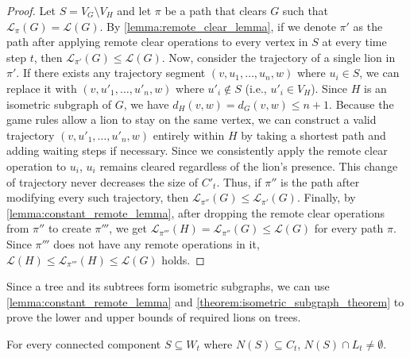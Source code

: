 \documentclass[a4paper,UKenglish,cleveref, autoref, thm-restate]{lipics-v2021}
\begin{document}
\begin{proof}
Let $S=V_G\setminus V_H$ and let $\pi$ be a path that clears $G$ such that $\mathcal{L}_\pi(G)=\mathcal{L}(G)$. By \cref{lemma:remote_clear_lemma}, if we denote $\pi'$ as the path after applying remote clear operations to every vertex in $S$ at every time step $t$, then $\mathcal{L}_{\pi'}(G) \leq \mathcal{L}(G)$. Now, consider the trajectory of a single lion in $\pi'$. If there exists any trajectory segment $(v, u_1, \dots, u_n, w)$ where $u_i \in S$, we can replace it with $(v, u'_1, \dots, u'_n, w)$ where $u'_i \notin S$ (i.e., $u'_i \in V_H$). Since $H$ is an isometric subgraph of $G$, we have $d_H(v, w) = d_G(v, w) \le n+1$. Because the game rules allow a lion to stay on the same vertex, we can construct a valid trajectory $(v, u'_1, \dots, u'_n, w)$ entirely within $H$ by taking a shortest path and adding waiting steps if necessary. Since we consistently apply the remote clear operation to $u_i$, $u_i$ remains cleared regardless of the lion's presence. This change of trajectory never decreases the size of $C'_t$. Thus, if $\pi''$ is the path after modifying every such trajectory, then $\mathcal{L}_{\pi''}(G) \leq \mathcal{L}_{\pi'}(G)$. Finally, by \cref{lemma:constant_remote_lemma}, after dropping the remote clear operations from $\pi''$ to create $\pi'''$, we get $\mathcal{L}_{\pi'''}(H) = \mathcal{L}_{\pi''}(G) \leq \mathcal{L}(G)$ for every path $\pi$. Since $\pi'''$ does not have any remote operations in it, $\mathcal{L}(H)\leq \mathcal{L}_{\pi'''}(H)\leq \mathcal{L}(G)$ holds.
\end{proof}

Since a tree and its subtrees form isometric subgraphs, we can use \cref{lemma:constant_remote_lemma} and \cref{theorem:isometric_subgraph_theorem} to prove the lower and upper bounds of required lions on trees.
\begin{lemma}\label{lemma:neighboring_contamination_component_lemma} For every connected component $S\subseteq W_t$ where $N(S)\subseteq C_t$, $N(S)\cap L_t\neq \emptyset$.
\end{lemma}
\end{document}
